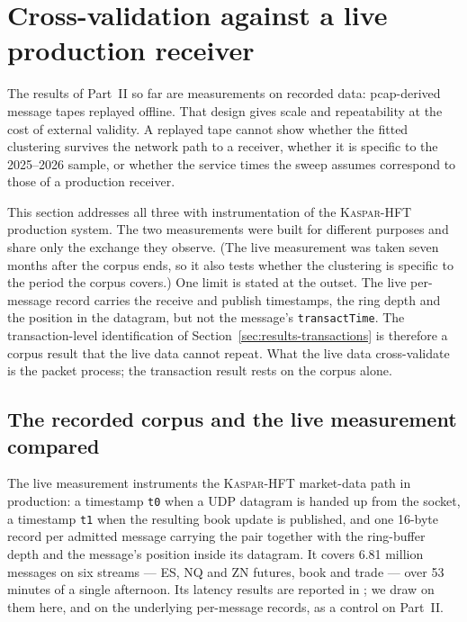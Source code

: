 \documentclass[11pt]{article}
\newcommand{\kasparhft}{\textsc{Kaspar-HFT}}
\begin{document}
\clearpage

\section{Cross-validation against a live production receiver}
\label{sec:crossval}

The results of Part~II so far are measurements on recorded data: pcap-derived message
tapes replayed offline. That design gives scale and repeatability at the cost of external
validity. A replayed tape cannot show whether the fitted clustering survives the network
path to a receiver, whether it is specific to the 2025--2026 sample, or whether the
service times the sweep assumes correspond to those of a production receiver.

This section addresses all three with instrumentation of the \kasparhft{} production system. The two
measurements were built for different purposes and share only the exchange they observe.
(The live measurement was taken seven months after the corpus ends, so it also tests
whether the clustering is specific to the period the corpus covers.)
One limit is stated at the outset. The live per-message record carries the receive and
publish timestamps, the ring depth and the position in the datagram, but not the
message's \texttt{transactTime}. The transaction-level identification of
Section~\ref{sec:results-transactions} is therefore a corpus result that the live data
cannot repeat. What the live data cross-validate is the packet process; the transaction
result rests on the corpus alone.

\subsection{The recorded corpus and the live measurement compared}
\label{sec:crossval-setup}

The live measurement instruments the \kasparhft{} market-data path in production: a
timestamp \texttt{t0} when a UDP datagram is handed up from the socket, a timestamp
\texttt{t1} when the resulting book update is published, and one 16-byte record per
admitted message carrying the pair together with the ring-buffer depth and the message's
position inside its datagram. It covers 6.81 million messages on six streams --- ES, NQ
and ZN futures, book and trade --- over 53 minutes of a single afternoon. Its latency
results are reported in \citet{mayeski_fastsend}; we draw on them here, and on the
underlying per-message records, as a control on Part~II.
\end{document}
